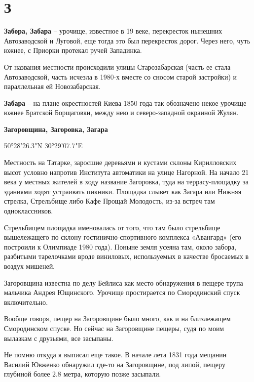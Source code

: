 \chapter*{З}

\textbf{Забора, Забара} – урочище, известное в 19 веке, перекресток нынешних Автозаводской и Луговой, еще тогда это был перекресток дорог. Через него, чуть южнее, с Приорки протекал ручей Западинка.

От названия местности происходили улицы Старозабарская (часть ее стала Автозаводской, часть исчезла в 1980-х вместе со сносом старой застройки) и параллельная ей Новозабарская.\\

\medskip

\textbf{Забара} – на плане окрестностей Киева 1850 года так обозначено некое урочище южнее Братской Борщаговки, между нею и северо-западной окраиной Жулян.\\

\medskip

\textbf{Загоровщина, Загоровка, Загара}

50°28'26.3"N 30°29'07.7"E

Местность на Татарке, заросшие деревьями и кустами склоны Кирилловских высот условно напротив Института автоматики на улице Нагорной. На начало 21 века у местных жителей в ходу название Загоровка, туда на террасу-площадку за зданиями ходят устраивать пикники. Площадка слывет как Загара или Нижняя стрелка, Стрельбище либо Кафе Прощай Молодость, из-за встреч там одноклассников.

Стрельбищем площадка именовалась от того, что там было стрельбище вышележащего по склону гостинично-спортивного комплекса «Авангард» (его построили к Олимпиаде 1980 года). Поныне земля усеяна там, около забора, разбитыми тарелочками вроде виниловых, используемых в качестве бросаемых в воздух мишеней.

Загоровщина известна по делу Бейлиса как место обнаружения в пещере трупа мальчика Андрея Ющинского. Урочище простирается по Смородинский спуск включительно.

Вообще говоря, пещер на Загоровщине было много, как и на близлежащем Смородинском спуске. Но сейчас на Загоровщине пещеры, судя по моим вылазкам с друзьями, все засыпаны.

Не помню откуда я выписал еще такое. В начале лета 1831 года мещанин Василий Ювженко обнаружил где-то на Загоровщине, под липой, пещеру глубиной более 2.8 метра, которую позже засыпали.

